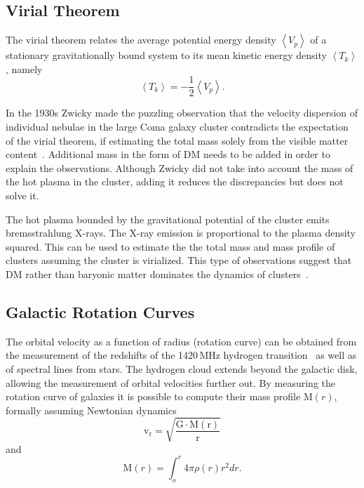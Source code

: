 \subsection{Virial Theorem}
\label{subsec:virial}
The virial theorem relates the average potential energy density $\left\langle V_p \right\rangle$ of a stationary gravitationally bound system to its mean kinetic energy density $\left\langle T_k \right\rangle $, namely
\begin{equation}
\left\langle T_k \right\rangle  =-\frac{1}{2}\left\langle V_p \right\rangle.
\end{equation}


In the 1930s Zwicky made the puzzling observation that the velocity dispersion of individual nebulae in the large Coma galaxy cluster contradicts the expectation of the virial theorem, if estimating the total mass solely from the visible matter content~\cite{Zwicky:1937zza}. Additional mass in the form of DM needs to be added in order to explain the observations. Although Zwicky did not take into account the mass of the hot plasma in the cluster, adding it reduces the discrepancies but does not solve it. 

The hot plasma bounded by the gravitational potential of the cluster emits bremsstrahlung X-rays. The X-ray emission is proportional to the plasma density squared. This can be used to estimate the the total mass and mass profile of clusters assuming the cluster is virialized. This type of observations suggest that DM rather than baryonic matter dominates the dynamics of clusters~\cite{Lewis:2002mfa}.

 


\subsection{Galactic Rotation Curves}
\label{subsec:RotCurve}
The orbital velocity as a function of radius (rotation curve) can be obtained from the measurement of the redshifts of the 1420\,MHz hydrogen transition~\cite{Begeman:1991iy} as well as of spectral lines from stars. The hydrogen cloud extends beyond the galactic disk, allowing the measurement of orbital velocities further out. By measuring the rotation curve of galaxies it is possible to compute their mass profile $\textrm{M}(r)$, formally assuming Newtonian dynamics
\begin{equation}
\mathrm{v_r = \sqrt{\frac{G \cdot M(r)}{r}}}
\end{equation}
and
\begin{equation}
\label{M_r}
\mathrm{M}(r) =  \int_o^r 4\pi \rho(r)r^2dr.
\end{equation}

